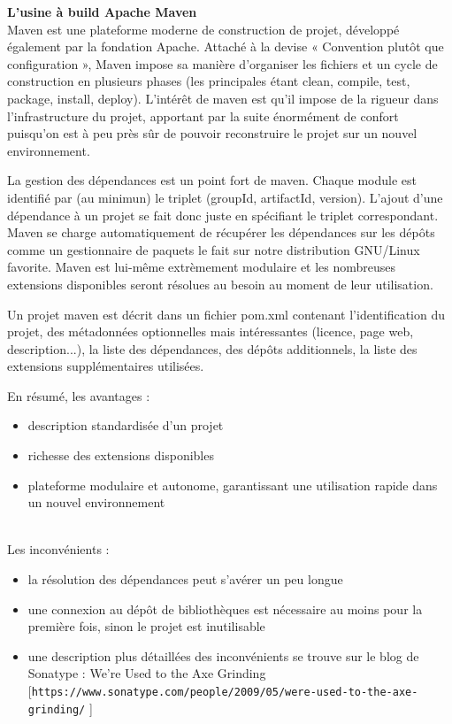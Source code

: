 \documentclass[11pt,twoside,a4paper]{article}
\begin{document}
\textbf{L'usine {\`a} build Apache Maven}~\\

Maven est une plateforme moderne de construction de projet, d{\'e}velopp{\'e} {\'e}galement par la fondation Apache.
Attach{\'e} {\`a} la devise « Convention plut{\^o}t que configuration », Maven impose sa mani{\`e}re d'organiser les fichiers et un cycle de construction en plusieurs phases (les principales {\'e}tant clean, compile, test, package, install, deploy). L'int{\'e}r{\^e}t de maven est qu'il impose de la rigueur dans l'infrastructure du projet, apportant par la suite {\'e}norm{\'e}ment de confort puisqu'on est {\`a} peu pr{\`e}s s{\^u}r de pouvoir reconstruire le projet sur un nouvel environnement.

La gestion des d{\'e}pendances est un point fort de maven. Chaque module est identifi{\'e} par (au minimun) le triplet (groupId, artifactId, version). L'ajout d'une d{\'e}pendance {\`a} un projet se fait donc juste en sp{\'e}cifiant le triplet correspondant. Maven se charge automatiquement de r{\'e}cup{\'e}rer les d{\'e}pendances sur les d{\'e}p{\^o}ts comme un gestionnaire de paquets le fait sur notre distribution GNU/Linux favorite.
Maven est lui-m{\^e}me extr{\`e}mement modulaire et les nombreuses extensions disponibles seront r{\'e}solues au besoin au moment de leur utilisation.

Un projet maven est d{\'e}crit dans un fichier pom.xml contenant l'identification du projet, des m{\'e}tadonn{\'e}es optionnelles mais int{\'e}ressantes (licence, page web, description...), la liste des d{\'e}pendances, des d{\'e}p{\^o}ts additionnels, la liste des extensions suppl{\'e}mentaires utilis{\'e}es.

En r{\'e}sum{\'e}, les avantages :
\begin{itemize}
	\item description standardis{\'e}e d'un projet
	\item richesse des extensions disponibles
	\item plateforme modulaire et autonome, garantissant une utilisation rapide dans un nouvel environnement
\end{itemize}~\\

Les inconv{\'e}nients :
\begin{itemize}
	\item la r{\'e}solution des d{\'e}pendances peut s'av{\'e}rer un peu longue
	\item une connexion au d{\'e}p{\^o}t de biblioth{\`e}ques est n{\'e}cessaire au moins pour la premi{\`e}re fois, sinon le projet est inutilisable
	\item une description plus d{\'e}taill{\'e}es des inconv{\'e}nients se trouve sur le blog de Sonatype : We're Used to the Axe Grinding [\texttt{https://www.sonatype.com/people/2009/05/were-used-to-the-axe-grinding/} ]
\end{itemize}~\\
\end{document}
